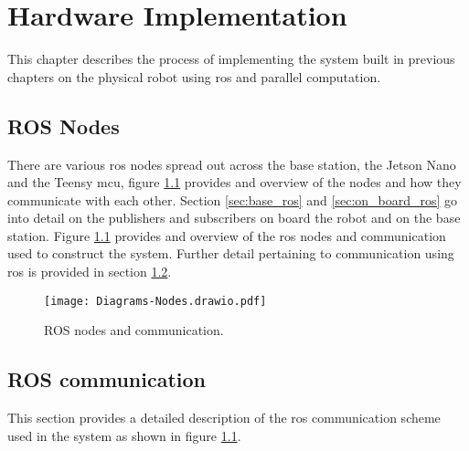 \chapter{Hardware Implementation} \label{chap:hardware}
This chapter describes the process of implementing the system built in previous chapters on the physical robot using \ac{ros} and parallel computation.

\section{ROS Nodes}
There are various ros nodes spread out across the base station, the Jetson Nano and the Teensy \ac{mcu}, figure \ref{fig:nodes} provides and overview
of the nodes and how they communicate with each other. Section \ref{sec:base_ros} and \ref{sec:on_board_ros} go into detail on the publishers and subscribers
on board the robot and on the base station. Figure \ref{fig:nodes} provides and overview of the \ac{ros} nodes and communication used to construct the system.
Further detail pertaining to communication using \ac{ros} is provided in section \ref{sec:ros_comms}.

\begin{figure}[h]
    \centering
    \texttt{[image: Diagrams-Nodes.drawio.pdf]}
    \caption{ROS nodes and communication.}
    \label{fig:nodes}
\end{figure}

\newpage
\section{ROS communication} \label{sec:ros_comms}
    This section provides a detailed description of the \ac{ros} communication scheme used in the system as shown in figure \ref{fig:nodes}.
